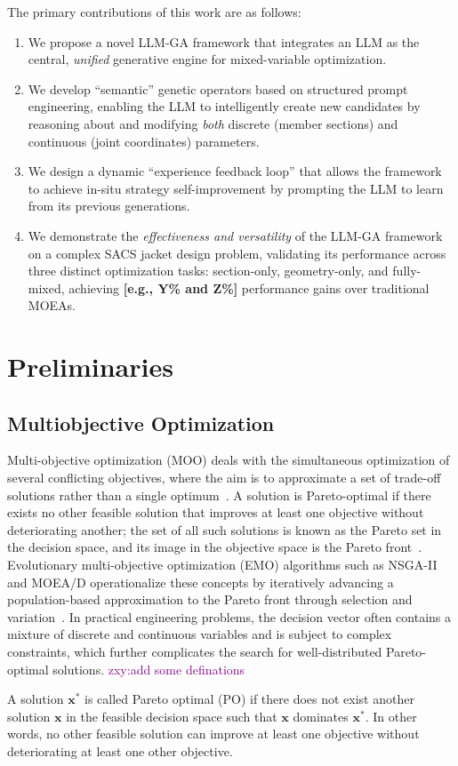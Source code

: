 \documentclass[preprint,12pt]{elsarticle}
\newcommand{\zxy}[1]{\textcolor{purple}{zxy:#1}}
\begin{document}
The primary contributions of this work are as follows:
\begin{enumerate}
    \item We propose a novel LLM-GA framework that integrates an LLM as the central, \textit{unified} generative engine for mixed-variable optimization.
    \item We develop ``semantic'' genetic operators based on structured prompt engineering, enabling the LLM to intelligently create new candidates by reasoning about and modifying \textit{both} discrete (member sections) and continuous (joint coordinates) parameters.
    \item We design a dynamic ``experience feedback loop'' that allows the framework to achieve in-situ strategy self-improvement by prompting the LLM to learn from its previous generations.
    \item We demonstrate the \textit{effectiveness and versatility} of the LLM-GA framework on a complex SACS jacket design problem, validating its performance across three distinct optimization tasks: section-only, geometry-only, and fully-mixed, achieving \textbf{[e.g., Y\% and Z\%]} performance gains over traditional MOEAs.
\end{enumerate}

\section{Preliminaries}
\subsection{Multiobjective Optimization}
Multi-objective optimization (MOO) deals with the simultaneous optimization of several conflicting objectives, where the aim is to approximate a set of trade-off solutions rather than a single optimum~\citep{Miettinen1999,Deb2001,Miettinen2005,Coello2007}. A solution is Pareto-optimal if there exists no other feasible solution that improves at least one objective without deteriorating another; the set of all such solutions is known as the Pareto set in the decision space, and its image in the objective space is the Pareto front~\citep{Miettinen1999,Miettinen2005}. Evolutionary multi-objective optimization (EMO) algorithms such as NSGA-II and MOEA/D operationalize these concepts by iteratively advancing a population-based approximation to the Pareto front through selection and variation~\citep{Deb2002,Zhang2007}. In practical engineering problems, the decision vector often contains a mixture of discrete and continuous variables and is subject to complex constraints, which further complicates the search for well-distributed Pareto-optimal solutions.
\zxy{add some definations}
\begin{definition}
    A solution $\mathbf{x}^*$ is called Pareto optimal (PO) if there does not exist another solution $\mathbf{x}$ in the feasible decision space such that $\mathbf{x}$ dominates $\mathbf{x}^*$. In other words, no other feasible solution can improve at least one objective without deteriorating at least one other objective.
\end{definition}
\end{document}
